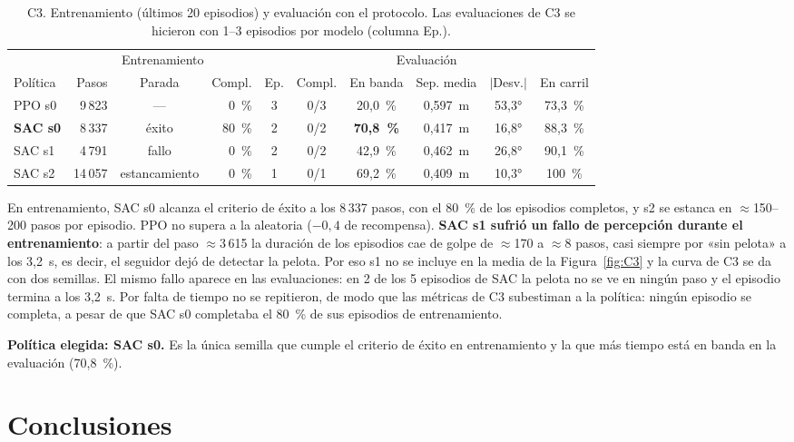 \documentclass[11pt,a4paper]{article}
\begin{document}
\begin{table}[h]
\centering\small
\caption{C3. Entrenamiento (últimos 20 episodios) y evaluación con el protocolo. Las evaluaciones de C3 se
hicieron con 1--3 episodios por modelo (columna Ep.).}
\label{tab:C3}
\setlength{\tabcolsep}{3.5pt}
\begin{tabular}{@{}lrcrcccccc@{}}
\toprule
& \multicolumn{3}{c}{Entrenamiento} & \multicolumn{6}{c}{Evaluación} \\
\cmidrule(lr){2-4}\cmidrule(l){5-10}
Política & Pasos & Parada & Compl. & Ep. & Compl. & En banda & Sep. media & $|$Desv.$|$ & En carril \\
\midrule
PPO s0 & 9\,823 & --- & 0~\% & 3 & 0/3 & 20,0~\% & 0,597~m & 53,3° & 73,3~\% \\
\textbf{SAC s0} & 8\,337 & éxito & 80~\% & 2 & 0/2 & \textbf{70,8~\%} & 0,417~m & 16,8° & 88,3~\% \\
SAC s1 & 4\,791 & fallo & 0~\% & 2 & 0/2 & 42,9~\% & 0,462~m & 26,8° & 90,1~\% \\
SAC s2 & 14\,057 & estancamiento & 0~\% & 1 & 0/1 & 69,2~\% & 0,409~m & 10,3° & 100~\% \\
\bottomrule
\end{tabular}
\end{table}

En entrenamiento, SAC s0 alcanza el criterio de éxito a los 8\,337 pasos, con el 80~\% de los episodios
completos, y s2 se estanca en $\approx$150--200 pasos por episodio. PPO no supera a la aleatoria
($-0{,}4$ de recompensa). \textbf{SAC s1 sufrió un fallo de percepción durante el entrenamiento}: a partir del paso
$\approx$3\,615 la duración de los episodios cae de golpe de $\approx$170 a $\approx$8 pasos, casi siempre por «sin
pelota» a los 3,2~s, es decir, el seguidor dejó de detectar la pelota. Por eso s1 no se incluye en la media de la
Figura~\ref{fig:C3} y la curva de C3 se da con dos semillas. El mismo fallo aparece en las evaluaciones: en 2 de
los 5 episodios de SAC la pelota no se ve en ningún paso y el episodio termina a los 3,2~s. Por falta de tiempo
no se repitieron, de modo que las métricas de C3 subestiman a la política: ningún episodio se completa, a pesar
de que SAC s0 completaba el 80~\% de sus episodios de entrenamiento.

\textbf{Política elegida: SAC s0.} Es la única semilla que cumple el criterio de éxito en entrenamiento y la que
más tiempo está en banda en la evaluación (70,8~\%).

\section{Conclusiones}
\end{document}
